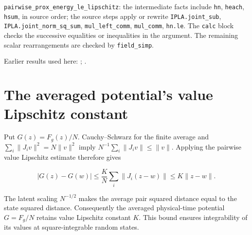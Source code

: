 \documentclass[11pt,a4paper]{article}
\begin{document}
\begin{leanbox}
\texttt{pairwise\_\allowbreak{}prox\_\allowbreak{}energy\_\allowbreak{}le\_\allowbreak{}lipschitz}: the intermediate facts include \texttt{hn}, \texttt{heach}, \texttt{hsum}, in source order; the source steps apply or rewrite \texttt{IPLA.\allowbreak{}joint\_\allowbreak{}sub}, \texttt{IPLA.\allowbreak{}joint\_\allowbreak{}norm\_\allowbreak{}sq\_\allowbreak{}sum}, \texttt{mul\_\allowbreak{}left\_\allowbreak{}comm}, \texttt{mul\_\allowbreak{}comm}, \texttt{hn.\allowbreak{}le}. The \texttt{calc} block checks the successive equalities or inequalities in the argument. The remaining scalar rearrangements are checked by \texttt{field\_\allowbreak{}simp}.
\end{leanbox}


Earlier results used here: \cite[Section~3.1.1]{LangevinLean2026IPLA}; \cite[Section~3.1.2]{LangevinLean2026IPLA}.

\section{\texorpdfstring{The averaged potential’s value Lipschitz constant}{The averaged potential’s value Lipschitz constant}}


Put \(G(z)=F_g(z)/N\). Cauchy–Schwarz for the finite average and \(\sum_i\|J_i v\|^2=N\|v\|^2\) imply \(N^{-1}\sum_i\|J_i v\|\le\|v\|\). Applying the pairwise value Lipschitz estimate therefore gives

\[|G(z)-G(w)|\le\frac KN\sum_i\|J_i(z-w)\|\le K\|z-w\|.\]

The latent scaling \(N^{-1/2}\) makes the average pair squared distance equal to the state squared distance. Consequently the averaged physical-time potential \(G=F_g/N\) retains value Lipschitz constant \(K\). This bound ensures integrability of its values at square-integrable random states.
\end{document}
